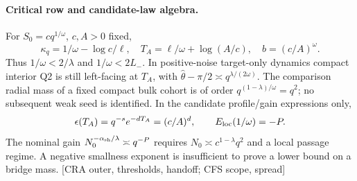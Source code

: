\documentclass[11pt]{article}
\newcommand{\src}[1]{\textnormal{\small[#1]}}
\begin{document}
\paragraph{Critical row and candidate-law algebra.}
For \(S_0=cq^{1/\omega}\), \(c,A>0\) fixed,
\[
 \kappa_q=1/\omega-\log c/\ell,\quad
 T_A=\ell/\omega+\log(A/c),\quad b=(c/A)^\omega.
\]
Thus \(1/\omega<2/\lambda\) and \(1/\omega<2L_-\). In positive-noise
target-only dynamics compact interior Q2 is still left-facing at
\(T_A\), with \(\widehat\theta-\pi/2\asymp q^{\lambda/(2\omega)}\).
The comparison radial mass of a fixed compact bulk cohort is of order
\(q^{(1-\lambda)/\omega}=q^2\); no subsequent weak seed is identified.
In the candidate profile/gain expressions only,
\[
 \epsilon(T_A)=q^{-s}e^{-dT_A}=(c/A)^d,\qquad
 E_{\rm loc}(1/\omega)=-P .
\]
The nominal gain \(N_0^{-\alpha_{\rm sh}/\lambda}\asymp q^{-P}\)
requires \(N_0\asymp c^{1-\lambda}q^2\) and a local passage regime.
A negative smallness exponent is insufficient to prove a lower
bound on a bridge mass. \src{CRA outer, thresholds, handoff; CFS scope, spread}
\end{document}
